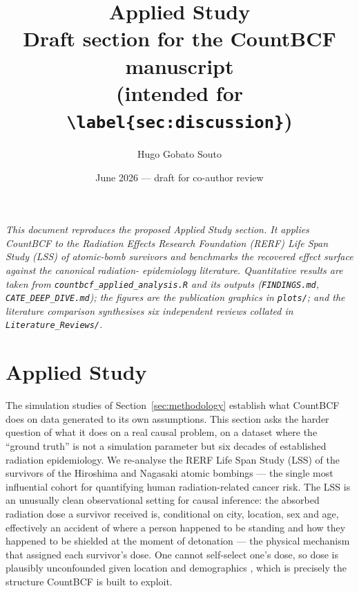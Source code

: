 \documentclass[11pt]{article}
\title{\textbf{Applied Study} \\[4pt]
       \large Draft section for the CountBCF manuscript \\
       (intended for \texttt{\textbackslash label\{sec:discussion\}})}
\author{Hugo Gobato Souto}
\date{June 2026 --- draft for co-author review}
\begin{document}
\maketitle

\noindent\textit{This document reproduces the proposed Applied Study
section. It applies CountBCF to the Radiation Effects Research
Foundation (RERF) Life Span Study (LSS) of atomic-bomb survivors and
benchmarks the recovered effect surface against the canonical radiation-%
epidemiology literature. Quantitative results are taken from
\texttt{countbcf\_applied\_analysis.R} and its outputs
(\texttt{FINDINGS.md}, \texttt{CATE\_DEEP\_DIVE.md}); the figures are the
publication graphics in \texttt{plots/}; and the literature comparison
synthesises six independent reviews collated in \texttt{Literature\_Reviews/}.}

\bigskip
\section{Applied Study}\label{sec:discussion}

The simulation studies of Section~\ref{sec:methodology} establish what
CountBCF does on data generated to its own assumptions. This section asks
the harder question of what it does on a real causal problem, on a dataset
where the ``ground truth'' is not a simulation parameter but six decades of
established radiation epidemiology. We re-analyse the RERF Life Span Study
(LSS) of the survivors of the Hiroshima and Nagasaki atomic bombings --- the
single most influential cohort for quantifying human radiation-related
cancer risk. The
LSS is an unusually clean observational setting for causal inference: the
absorbed radiation dose a survivor received is, conditional on city,
location, sex and age, effectively an accident of where a
person happened to be standing and how they happened to be shielded at the
moment of detonation --- the physical mechanism that assigned each
survivor's dose. One cannot self-select one's dose, so dose is
plausibly unconfounded given location and demographics \citep{pierce2000},
which is precisely the structure CountBCF is built to exploit.
\end{document}

